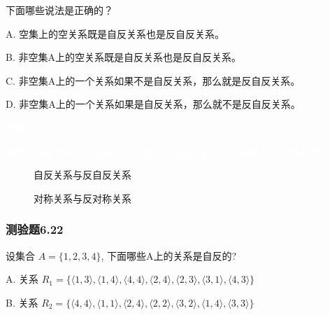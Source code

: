 \documentclass[UTF8, heading=true]{ctexart}
\begin{document}
下面哪些说法是正确的？

A. 空集上的空关系既是自反关系也是反自反关系。

B. 非空集A上的空关系既是自反关系也是反自反关系。

C. 非空集A上的一个关系如果不是自反关系，那么就是反自反关系。

D.  非空集A上的一个关系如果是自反关系，那么就不是反自反关系。

\textcolor{white}{答案：AD}

\textcolor{white}{解析：自反关系和反自反关系、对称关系和反对称关系满足以下的维恩图：}

\begin{figure}[H]
  \centering
  \begin{minipage}{0.45\textwidth}
      \centering
      \caption{自反关系与反自反关系}
  \end{minipage}
  \hspace{0.1cm}
  \begin{minipage}{0.45\textwidth}
      \centering
      \caption{对称关系与反对称关系}
  \end{minipage}
\end{figure}

\subsubsection{测验题6.22}

设集合 $A=\{1,2,3,4\}$, 下面哪些A上的关系是自反的?

A. 关系 $R_1=\{\langle 1,3\rangle,\langle 1,4\rangle,\langle 4,4\rangle,\langle 2,4\rangle,\langle 2,3\rangle,\langle 3,1\rangle,\langle 4,3\rangle\}$

B. 关系 $R_2=\{\langle 4,4\rangle,\langle 1,1\rangle,\langle 2,4\rangle,\langle 2,2\rangle,\langle 3,2\rangle,\langle 1,4\rangle,\langle 3,3\rangle\}$
\end{document}

